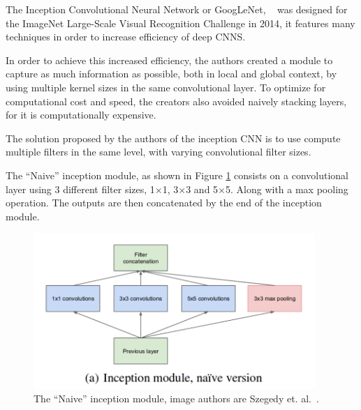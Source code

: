 The Inception Convolutional Neural Network or GoogLeNet, ~\cite{szegedy2015Inception} was designed for the ImageNet Large-Scale Visual Recognition Challenge in 2014, it features many techniques in order to increase efficiency of deep CNNS.

In order to achieve this increased efficiency, the authors created a module to capture as much information as possible, both in local and global context, by using multiple kernel sizes in the same convolutional layer. To optimize for computational cost and speed, the creators also avoided naively stacking layers, for it is computationally expensive.

The solution proposed by the authors of the inception CNN is to use compute multiple filters in the same level, with varying convolutional filter sizes.

The ``Naive'' inception module, as shown in Figure \ref{fig:naive-inception} consists on a convolutional layer using 3 different filter sizes, 1$\times$1, 3$\times$3 and 5$\times$5. Along with a max pooling operation. The outputs are then concatenated by the end of the inception module.

\begin{figure}[!ht]
    \centering
    \includegraphics[width=0.95\textwidth]{img/naive-inception.png}
    \caption{The ``Naive'' inception module, image authors are Szegedy et. al.~\cite{szegedy2015Inception}.}
    \label{fig:naive-inception}
\end{figure}


